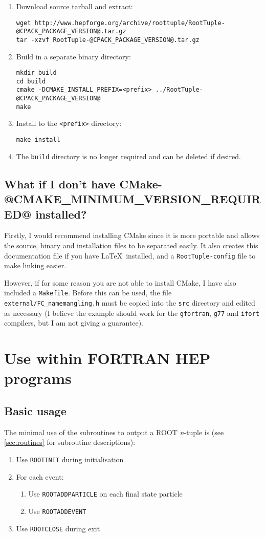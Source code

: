 \documentclass[a4paper,12pt]{article}
\begin{document}
\begin{enumerate}
    \item Download source tarball and extract:\begin{verbatim}
wget http://www.hepforge.org/archive/roottuple/RootTuple-@CPACK_PACKAGE_VERSION@.tar.gz
tar -xzvf RootTuple-@CPACK_PACKAGE_VERSION@.tar.gz\end{verbatim}
    \item Build in a separate binary directory:\begin{verbatim}
mkdir build
cd build
cmake -DCMAKE_INSTALL_PREFIX=<prefix> ../RootTuple-@CPACK_PACKAGE_VERSION@
make\end{verbatim}
    \item Install to the \verb|<prefix>| directory:\begin{verbatim}
make install\end{verbatim}
    \item The \verb|build| directory is no longer required and can be deleted if desired.
\end{enumerate}

\subsection{What if I don't have CMake-@CMAKE_MINIMUM_VERSION_REQUIRED@ installed?}
Firstly, I would recommend installing CMake since it is more portable and allows the source, binary and installation files to be separated easily. It also creates this documentation file if you have \LaTeX~installed, and a \verb|RootTuple-config| file to make linking easier.

However, if for some reason you are not able to install CMake, I have also included a \verb|Makefile|. Before this can be used, the file \verb|external/FC_namemangling.h| must be copied into the \verb|src| directory and edited as necessary (I believe the example should work for the \verb|gfortran|, \verb|g77| and \verb|ifort| compilers, but I am not giving a guarantee).

\section{Use within FORTRAN HEP programs}
\label{sec:usage}
\subsection{Basic usage}
The minimal use of the subroutines to output a ROOT \emph{n}-tuple is (see \textsection\ref{sec:routines} for subroutine descriptions):
\begin{enumerate}
    \item Use \verb|ROOTINIT| during initialisation
    \item For each event:
    \begin{enumerate}
        \item Use \verb|ROOTADDPARTICLE| on each final state particle
        \item Use \verb|ROOTADDEVENT|
    \end{enumerate}
    \item Use \verb|ROOTCLOSE| during exit
\end{enumerate}
\end{document}

